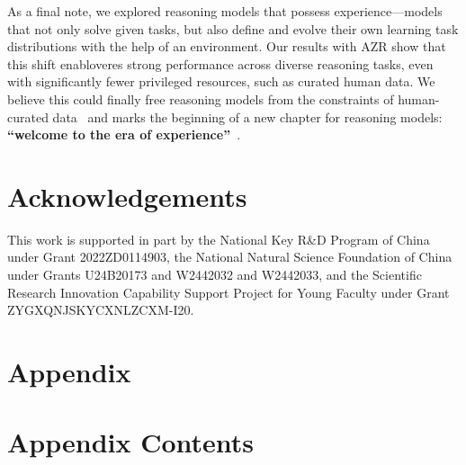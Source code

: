 \documentclass{article}
\begin{document}
As a final note, we explored reasoning models that possess experience—models that not only solve given tasks, but also define and evolve their own learning task distributions with the help of an environment. Our results with AZR show that this shift enabloveres strong performance across diverse reasoning tasks, even with significantly fewer privileged resources, such as curated human data. We believe this could finally free reasoning models from the constraints of human-curated data~\citep{jxmo2024noideas} and marks the beginning of a new chapter for reasoning models: \textbf{``welcome to the era of experience''}~\cite{silver2025era,zhao2024expel}.

\section*{Acknowledgements}
This work is supported in part by the National Key R\&D Program of China under Grant 2022ZD0114903, the National Natural Science Foundation of China under Grants U24B20173 and W2442032 and W2442033, and the Scientific Research Innovation Capability Support Project for Young Faculty under Grant ZYGXQNJSKYCXNLZCXM-I20.






\newpage
\appendix
\section*{Appendix}

\renewcommand{\thesection}{\Alph{section}} %

\startcontents[appendix] %
\section*{Appendix Contents} %
               {\setcounter{tocdepth}{2}} %
\clearpage
\end{document}
